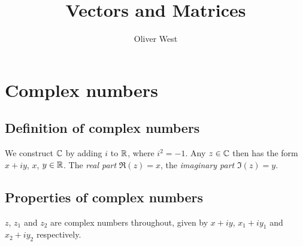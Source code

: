\documentclass{../template/note}
\author{Oliver West}
\title{Vectors and Matrices}
\date{}
\begin{document}
    
    \maketitle

    \tableofcontents

    
    \section{Complex numbers}

    \subsection{Definition of complex numbers}

    We construct \(\mathbb C\) by adding \(i\) to \(\mathbb R\), where \(i^2=-1\). Any \(z \in \mathbb C\) then has the form \(x + iy\), \(x\), \(y \in \mathbb R\). The \emph{real part} \(\Re(z) = x\), the \emph{imaginary part} \(\Im(z) = y\).

    \subsection{Properties of complex numbers}

    \(z\), \(z_1\) and \(z_2\) are complex numbers throughout, given by \(x+iy\), \(x_1+iy_1\) and \(x_2+iy_2\) respectively.
\end{document}
